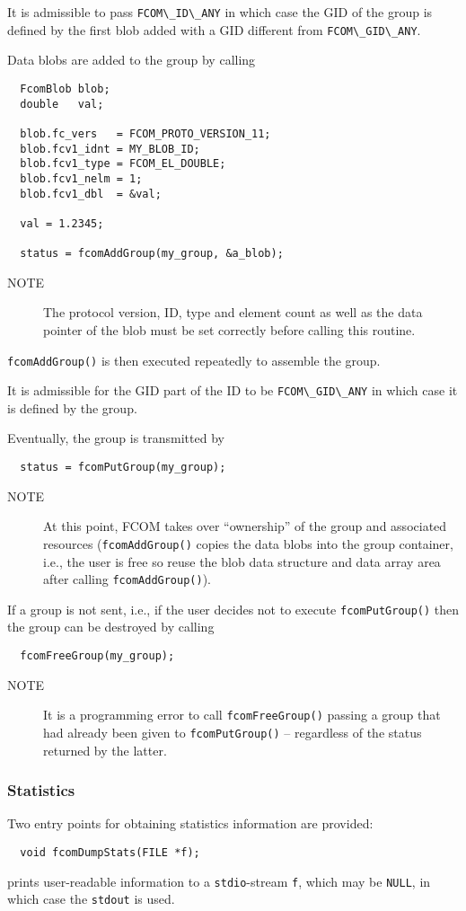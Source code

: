 \documentclass[11pt]{article}
\newcommand{\fcom}{FCOM}
\newcommand{\blob}{blob}
\newcommand{\group}{group}
\newcommand{\cstl}[1]{{\lstinline+#1+}}
\newcommand{\note}[1]{
	\begin{description}
		\item[NOTE] #1
	\end{description}
}
\begin{document}
      It is admissible to pass \cstl{FCOM\_ID\_ANY} in which
      case the GID of the group is defined by the first
	  blob added with a GID different from \cstl{FCOM\_GID\_ANY}.

      Data \blob{}s are added to the group by calling
      \begin{verbatim}
  FcomBlob blob;
  double   val;

  blob.fc_vers   = FCOM_PROTO_VERSION_11;
  blob.fcv1_idnt = MY_BLOB_ID; 
  blob.fcv1_type = FCOM_EL_DOUBLE;
  blob.fcv1_nelm = 1;
  blob.fcv1_dbl  = &val;
  
  val = 1.2345;

  status = fcomAddGroup(my_group, &a_blob);
      \end{verbatim}
      \note{The protocol version, ID, type and element
      count as well as the data pointer of the \blob{}
      must be set correctly before calling this routine.}
      {\tt fcomAddGroup()} is then executed repeatedly
      to assemble the \group{}.

      It is admissible for the GID part of the ID to
      be \cstl{FCOM\_GID\_ANY} in which case it is defined
      by the group.

      Eventually, the \group{} is transmitted by
      \begin{verbatim}
  status = fcomPutGroup(my_group);
      \end{verbatim}
      \note{At this point, \fcom{} takes over 
      ``ownership'' of the group and associated resources
      ({\tt fcomAddGroup()} copies the data \blob{}s
      into the \group{} container, i.e., the user is
      free so reuse the \blob{} data structure and data 
      array area after calling {\tt fcomAddGroup()}).}

      If a \group{} is not sent, i.e., if the
      user decides not to execute {\tt fcomPutGroup()}
      then the \group{} can be destroyed by
      calling
      \begin{verbatim}
  fcomFreeGroup(my_group);
      \end{verbatim}
      \note{It is a programming error to call {\tt fcomFreeGroup()}
            passing a \group{} that had already been given to
            {\tt fcomPutGroup()} -- regardless of the status
            returned by the latter.}
    \subsubsection{Statistics}
      Two entry points for obtaining statistics information are
      provided:
      \begin{verbatim}
  void fcomDumpStats(FILE *f);
      \end{verbatim}
      prints user-readable information to a \cstl{stdio}-stream
      \cstl{f}, which may be \cstl{NULL}, in which case
      the \cstl{stdout} is used.
\end{document}
